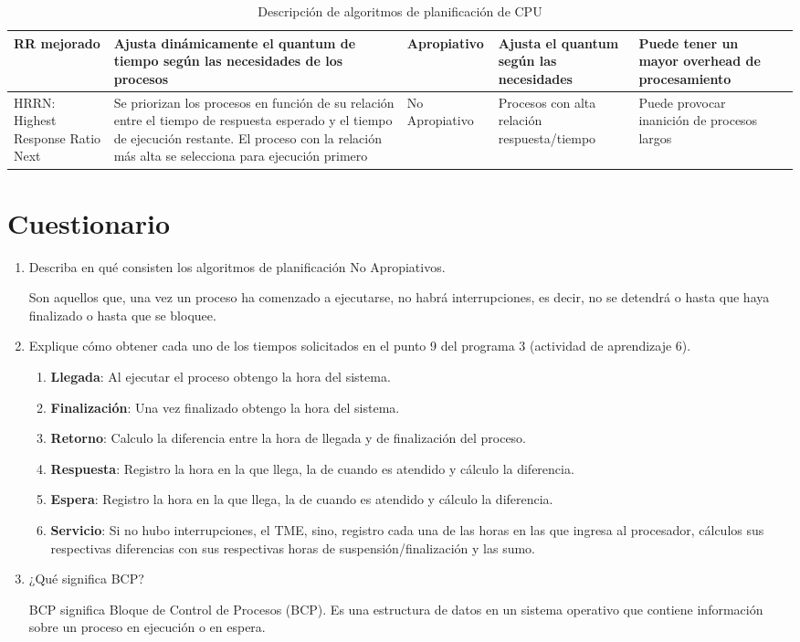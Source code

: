 \documentclass[12pt, a4paper]{article} %
\begin{document}
\begin{table}[h]
\begin{tabular}{|m{1.8cm}|m{6cm}|m{2cm}|m{2cm}|m{2cm}|m{2cm}}
		RR mejorado & Ajusta dinámicamente el quantum de tiempo según las necesidades de los procesos & Apropiativo & Ajusta el quantum según las necesidades & Puede tener un mayor overhead de procesamiento\\ \hline
		HRRN: Highest Response Ratio Next & Se priorizan los procesos en función de su relación entre el tiempo de respuesta esperado y el tiempo de ejecución restante. El proceso con la relación más alta se selecciona para ejecución primero & No Apropiativo & Procesos con alta relación respuesta/tiempo & Puede provocar inanición de procesos largos\\ \hline
	\end{tabular}
	\caption{Descripción de algoritmos de planificación de CPU}
\end{table}

\clearpage
\section*{Cuestionario}

\begin{enumerate}
	\item Describa en qué consisten los algoritmos de planificación No Apropiativos.
		
		Son aquellos que, una vez un proceso ha comenzado a ejecutarse, no habrá interrupciones, es decir, no se detendrá o hasta que haya finalizado o hasta que se bloquee.

	\item Explique cómo obtener cada uno de los tiempos solicitados en el punto 9 del programa 3 (actividad de aprendizaje 6).

	\begin{enumerate}
		\item \textbf{Llegada}: Al ejecutar el proceso obtengo la hora del sistema.
		\item \textbf{Finalización}: Una vez finalizado obtengo la hora del sistema.
		\item \textbf{Retorno}: Calculo la diferencia entre la hora de llegada y de finalización del proceso.
		\item \textbf{Respuesta}: Registro la hora en la que llega, la de cuando es atendido y cálculo la diferencia.
		\item \textbf{Espera}: Registro la hora en la que llega, la de cuando es atendido y cálculo la diferencia.
		\item \textbf{Servicio}: Si no hubo interrupciones, el TME, sino, registro cada una de las horas en las que ingresa al procesador, cálculos sus respectivas diferencias con sus respectivas horas de suspensión/finalización y las sumo.
	\end{enumerate}

	\item ¿Qué significa BCP? 

		BCP significa Bloque de Control de Procesos (BCP). Es una estructura de datos en un sistema operativo que contiene información sobre un proceso en ejecución o en espera.
\end{enumerate}
\end{document}
